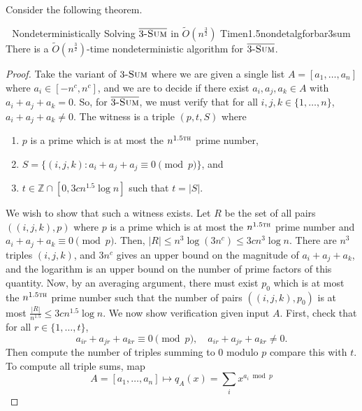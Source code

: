         Consider the following theorem.
        \begin{theorem}{\Stop\,\,\cite{carmosino2016nseth} Nondeterministically Solving \(\bar{3\textsc{-Sum}}\) in \(\tilde{O}(n^{\frac{3}{2}})\) Time}{n1.5nondetalgforbar3sum}
            There is a \(\tilde{O}\left(n^{\frac{3}{2}}\right)\)-time nondeterministic algorithm for \(\bar{3\textsc{-Sum}}\).
            \begin{proof}
                Take the variant of \(3\textsc{-Sum}\) where we are given a single list \(A=[a_1,\ldots,a_n]\) where \(a_i\in[-n^c,n^c]\), and we are to decide if there exist \(a_i,a_j,a_k\in A\) with \(a_i+a_j+a_k=0\). So, for \(\bar{3\textsc{-Sum}}\), we must verify that for all \(i,j,k\in\{1,\ldots,n\}\), \(a_i+a_j+a_k\neq0\). The witness is a triple \((p,t,S)\) where 
                \begin{enumerate}
                    \item \(p\) is a prime which is at most the \(n^{1.5\textsc{th}}\) prime number,
                    \item \(S=\{(i,j,k):a_i+a_j+a_j\equiv0\pmod{p}\}\), and
                    \item \(t\in\mathbb{Z}\cap[0,3cn^{1.5}\log n]\) such that \(t=|S|\).
                \end{enumerate}
                We wish to show that such a witness exists. Let \(R\) be the set of all pairs \(((i,j,k),p)\) where \(p\) is a prime which is at most the \(n^{1.5\textsc{th}}\) prime number and \(a_i+a_j+a_k\equiv0\pmod{p}\). Then, \(|R|\leq n^3\log(3n^c)\leq 3cn^3\log n\). There are \(n^3\) triples \((i,j,k)\), and \(3n^c\) gives an upper bound on the magnitude of \(a_i+a_j+a_k\), and the logarithm is an upper bound on the number of prime factors of this quantity. Now, by an averaging argument, there must exist \(p_0\) which is at most the \(n^{1.5\textsc{th}}\) prime number such that the number of pairs \(((i,j,k),p_0)\) is at most \(\frac{|R|}{n^{1.5}}\leq 3cn^{1.5}\log n\). We now show verification given input \(A\). First, check that for all \(r\in\{1,\ldots,t\}\),
                \begin{equation*}
                    a_{ir}+a_{jr}+a_{kr}\equiv0\pmod{p},\quad a_{ir}+a_{jr}+a_{kr}\neq0.
                \end{equation*}
                Then compute the number of triples summing to \(0\) modulo \(p\) compare this with \(t\). To compute all triple sums, map
                \begin{equation*}
                    A=[a_1,\ldots,a_n]\mapsto q_A(x)=\sum_{i}x^{a_i\bmod p}

\end{equation*}
\end{proof}
\end{theorem}
